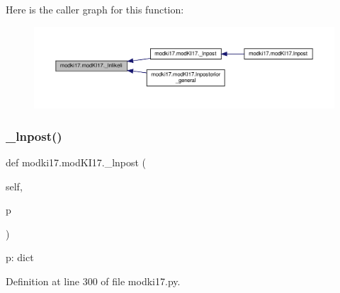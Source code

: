 Here is the caller graph for this function\+:\nopagebreak
\begin{figure}[H]
\begin{center}
\leavevmode
\includegraphics[width=350pt]{df/da3/classmodki17_1_1modKI17_a54b0d8abd39c0ab4c04cb1e52eafe9c5_icgraph}
\end{center}
\end{figure}
\mbox{\label{classmodki17_1_1modKI17_a13262c1d5c53fa14ca3e74df3bcfd7bf}} 
\subsubsection{\texorpdfstring{\+\_\+lnpost()}{\_lnpost()}}
{\footnotesize\ttfamily def modki17.\+mod\+K\+I17.\+\_\+lnpost (\begin{DoxyParamCaption}\item[{}]{self,  }\item[{}]{p }\end{DoxyParamCaption})\hspace{0.3cm}{\ttfamily [private]}}

\begin{DoxyVerb}p: dict
\end{DoxyVerb}
 

Definition at line 300 of file modki17.\+py.


